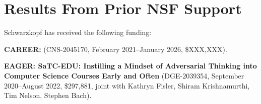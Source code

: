 %
%
%
%
%
%

\section{Results From Prior NSF Support}
\label{s:prior}

Schwarzkopf has received the following funding:

\textbf{CAREER: } (CNS-2045170, February 2021--January 2026, \$XXX,XXX).
%

\textbf{EAGER: SaTC-EDU: Instilling a Mindset of Adversarial Thinking into
Computer Science Courses Early and Often} (DGE-2039354,
September 2020--August 2022, \$297,881, joint with Kathryn Fisler, Shiram
Krishnamurthi, Tim Nelson, Stephen Bach).
%

